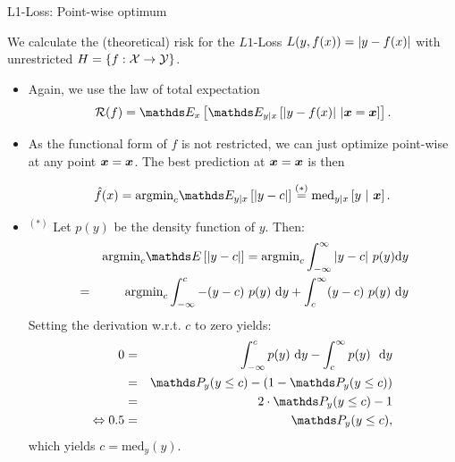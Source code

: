 \begin{vbframe}{L1-Loss: Point-wise optimum}

We calculate the (theoretical) risk for the $L1$-Loss $L(y, f(x)) = \left|y-f(x)\right|$ with unrestricted $H = \{f: \mathcal{X} \to \mathcal{Y}\}$. 

\begin{itemize}
  \item Again, we use the law of total expectation 
  $$
    \riskf = \E_x \left[\E_{y|x}\left[|y-\fx|~|\xv = \xv\right]\right]. 
  $$
  \item As the functional form of $f$ is not restricted, we can just optimize point-wise at any point $\bm{x} = \bm{x}$. The best prediction at $\bm{x} = \bm{x}$ is then 

  $$
    \fxh = \mbox{argmin}_c \E_{y|x}\left[|y - c|\right]\overset{(*)}{=} \text{med}_{y|x} \left[y ~|~ \xv \right]. 
  $$

  \framebreak 

  \item $^{(*)}$ Let $p(y)$ be the density function of $y$. Then: 
  \begin{eqnarray*}
  && \mbox{argmin}_c \E\left[|y - c|\right] = \mbox{argmin}_c \int_{-\infty}^\infty |y - c| ~ p(y) \text{d}y \\
  &=& \mbox{argmin}_c \int_{-\infty}^c -(y - c)~p(y)~\text{d}y + \int_c^\infty (y - c)~p(y)~\text{d}y 
  \end{eqnarray*}
  Setting the derivation w.r.t. $c$ to zero yields: 
  \begin{eqnarray*}
  0 &=& \int_{-\infty}^c p(y)~\text{d}y - \int_c^\infty p(y)~~\text{d}y \\
  &=& \P_y (y \le c) - \left(1 - \P_y (y \le c)\right)\\
  &=& 2 \cdot \P_y (y \le c) - 1 \\
  \Leftrightarrow 0.5 &=& \P_y (y \le c),
  \end{eqnarray*}
  which yields $c = \text{med}_y(y)$.  

\end{itemize}

\end{vbframe}


